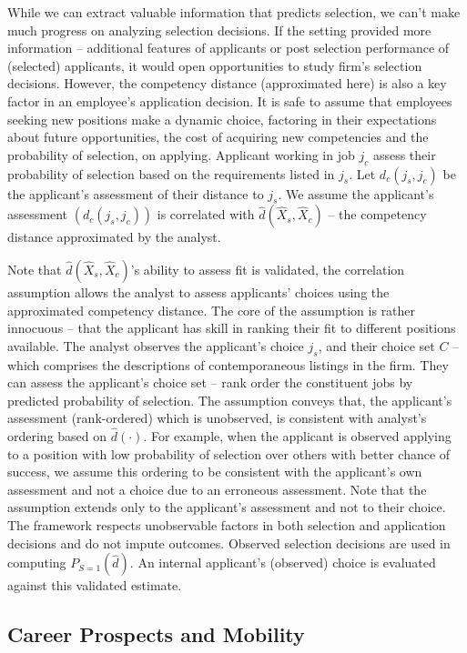 \documentclass{article}
\begin{document}
While we can extract valuable information that predicts selection, we can't make much progress on analyzing selection decisions. If the setting provided more information -- additional features of applicants or post selection performance of (selected) applicants, it would open opportunities to study firm’s selection decisions. However, the competency distance (approximated here) is also a key factor in an employee’s application decision. It is safe to assume that employees seeking new positions make a dynamic choice, factoring in their expectations about future opportunities, the cost of acquiring new competencies and the probability of selection, on applying. Applicant working in job \( j_c \) assess their probability of selection based on the requirements listed in \( j_s \). Let \( d_c(j_s, j_c) \) be the applicant’s assessment of their distance to \( j_s \). We assume the applicant’s assessment \( (d_c(j_s, j_c)) \) is correlated with \( \hat{d}(\hat{X}_s, \hat{X}_c) \) -- the competency distance approximated by the analyst.

Note that \( \hat{d}(\hat{X}_s, \hat{X}_c) \)’s ability to assess fit is validated, the correlation assumption allows the analyst to assess applicants’ choices using the approximated competency distance. The core of the assumption is rather innocuous -- that the applicant has skill in ranking their fit to different positions available. The analyst observes the applicant’s choice \( j_s \), and their choice set \( C \) -- which comprises the descriptions of contemporaneous listings in the firm. They can assess the applicant’s choice set -- rank order the constituent jobs by predicted probability of selection. The assumption conveys that, the applicant’s assessment (rank-ordered) which is unobserved, is consistent with analyst’s ordering based on \( \hat{d}(\cdot) \). For example, when the applicant is observed applying to a position with low probability of selection over others with better chance of success, we assume this ordering to be consistent with the applicant’s own assessment and not a choice due to an erroneous assessment. Note that the assumption extends only to the applicant’s assessment and not to their choice. The framework respects unobservable factors in both selection and application decisions and do not impute outcomes. Observed selection decisions are used in computing \( P_{S=1}(\hat{d}) \). An internal applicant’s (observed) choice is evaluated against this validated estimate.


\subsection{Career Prospects and Mobility}
\end{document}

